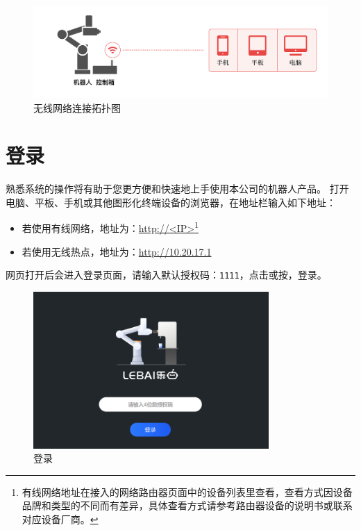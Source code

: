 \begin{figure}[ht]
    \centering
    \includegraphics[width=\textwidth]{image/network-2.pdf}
    \caption{无线网络连接拓扑图}
    \label{fig:无线网络连接拓扑图}
\end{figure}

\clearpage

\section{登录\LM}
熟悉\LM 系统的操作将有助于您更方便和快速地上手使用本公司的机器人产品。
打开电脑、平板、手机或其他图形化终端设备的浏览器，在地址栏输入如下地址：
\begin{itemize}
	\item 若使用有线网络，地址为：\url{http://<IP>}\footnote{有线网络地址在接入的网络路由器页面中的设备列表里查看，查看方式因设备品牌和类型的不同而有差异，具体查看方式请参考路由器设备的说明书或联系对应设备厂商。}
	\item 若使用无线热点，地址为：\url{http://10.20.17.1}
\end{itemize}

网页打开后会进入登录页面，请输入默认授权码：\verb|1111|，点击或按，登录\LM。

\begin{figure}[ht]
    \centering
    \includegraphics[width=0.8\textwidth]{screen/2-4.png}
    \caption{登录\LM}
    \label{fig:登录LM}
\end{figure}

